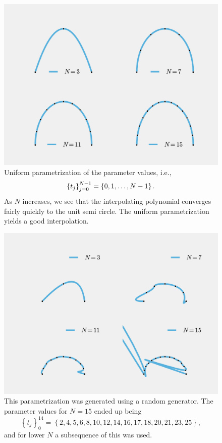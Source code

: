 \documentclass[a4paper]{article}
\begin{document}
    \begin{figure}[htbp]
        \centering
        \includegraphics[width=0.8\linewidth]{uniform.pdf}
        \caption{Uniform parametrization of the parameter values, i.e.,
    \begin{equation}
        \notag
        \left\{ t_j \right\}_{j=0}^{N-1} = \left\{ 0, 1, \ldots, N-1 \right\}.
    \end{equation}
    As $N$ increases, we see that the interpolating polynomial converges fairly
quickly to the unit semi circle. The uniform parametrization yields a good
interpolation.}
        \label{fig:uniform}
    \end{figure}
    
    \begin{figure}[htpb]
        \centering
        \includegraphics[width=0.8\linewidth]{random.pdf}
        \caption{This parametrization was generated using a random generator.
            The parameter values for $N = 15$ ended up being
            $$\left\{t_j\right\}_{0}^{14} = \left\{2, 4,  5,  6,
            8, 10, 12, 14, 16, 17, 18, 20, 21, 23, 25\right\},$$ and for lower $N$ a
        subsequence of this was used.}
        \label{fig:random}
    \end{figure}
\end{document}
